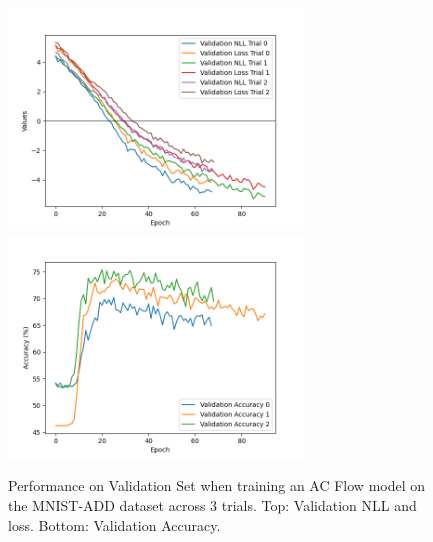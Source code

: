 \begin{figure}[!h]
    \centering
    \includegraphics[width=0.7\textwidth]{figs/evaluation/mnist_acflow_no_val_accuracy_no_l2_loss_nll.png}
    \includegraphics[width=0.7\textwidth]{figs/evaluation/mnist_acflow_no_val_accuracy_no_l2_accuracy.png}
    \caption{
        Performance on Validation Set when training an AC Flow model
        on the MNIST-ADD dataset across 3 trials.
        Top: Validation NLL and loss. Bottom: Validation Accuracy.
    }
    \label{fig:mnist-acflow-no-val-accuracy-no-l2-loss}
\end{figure}


